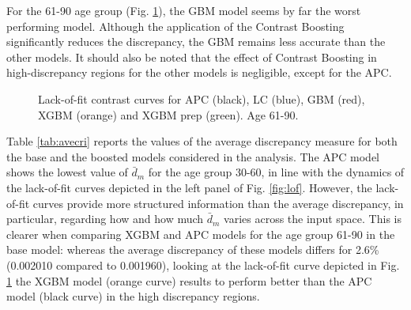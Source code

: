 \documentclass[fleqn,10pt]{wlscirep}
\begin{document}
%
For the 61-90 age group (Fig. \ref{fig:lof61}), the GBM model seems by far the worst performing model. Although the application of the Contrast Boosting significantly reduces the discrepancy, the GBM remains less accurate than the other models. It should also be noted that the effect of Contrast Boosting in high-discrepancy regions for the other models is negligible, except for the APC.
%
\begin{figure}[ht]
\centering
{}
\caption{Lack-of-fit contrast curves for APC (black), LC (blue), GBM (red), XGBM (orange) and XGBM prep (green). Age 61-90.}
\label{fig:lof61}
\end{figure}
%
Table \ref{tab:avecri} reports the values of the average discrepancy measure for both the base and the boosted models considered in the analysis. 
The APC model shows the lowest value of $\bar{d}_m$ for the age group 30-60, in line with the dynamics of the lack-of-fit curves depicted in the left panel of Fig. \ref{fig:lof}.
However, the lack-of-fit curves provide more structured information than the average discrepancy, in particular, regarding how and how much $\bar{d}_m$ varies across the input space. This is clearer when comparing XGBM and APC models for the age group 61-90 in the base model: whereas the average discrepancy of these models differs for 2.6\% (0.002010 compared to 0.001960), looking at the lack-of-fit curve depicted in Fig. \ref{fig:lof61} the XGBM model (orange curve) results to perform better than the APC model (black curve) in the high discrepancy regions. 
\end{document}
